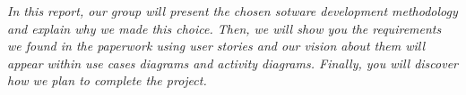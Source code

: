 \textit{In this report, our group will present the chosen sotware development
methodology and explain why we made this choice. Then, we will show you
the requirements we found in the paperwork using user stories and our
vision about them will appear within use cases diagrams and activity
diagrams. Finally, you will discover how we plan to complete the
project.} \newline
